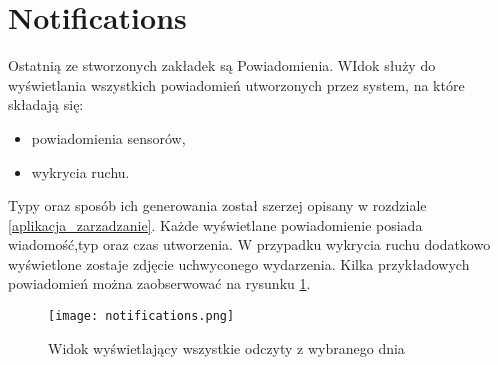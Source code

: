 \section{Notifications}
Ostatnią ze stworzonych zakładek są Powiadomienia. WIdok służy do wyświetlania wszystkich powiadomień utworzonych przez system, na które składają się:
\begin{itemize}
\item powiadomienia sensorów,
\item wykrycia ruchu.
\end{itemize}
 Typy oraz sposób ich generowania został szerzej opisany w rozdziale \ref{aplikacja_zarzadzanie}. Każde wyświetlane powiadomienie posiada wiadomość,typ oraz czas utworzenia. W przypadku wykrycia ruchu dodatkowo wyświetlone zostaje zdjęcie uchwyconego wydarzenia. Kilka przykładowych powiadomień można zaobserwować na rysunku \ref{fig:notifications}.
\begin{figure}[H]
	\centering
	\texttt{[image: notifications.png]}
	\caption{Widok wyświetlający wszystkie odczyty z wybranego dnia}
	\label{fig:notifications}
\end{figure}